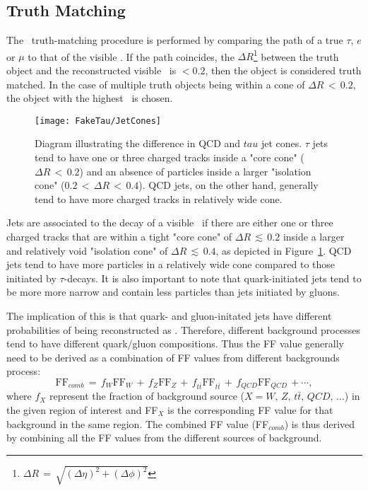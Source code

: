 	\subsection*{Truth Matching}
	The \htau\ truth-matching procedure is performed by comparing the path of a true $\tau$, $e$ or $\mu$ to that of the visible \htau. If the path coincides, \ie the $\Delta R$\footnote{$\Delta R\,=\,\sqrt{(\Delta\eta)^2+(\Delta\phi)^2}$} between the truth object and the reconstructed visible \htau\ is $<0.2$, then the object is considered truth matched. In the case of multiple truth objects being within a cone of $\Delta R\,<\, 0.2$, the object with the highest \pt\ is chosen.
	 
	\begin{figure}[!hbt]
	\centering
	\texttt{[image: FakeTau/JetCones]}
	\caption{Diagram illustrating the difference in QCD and $tau$ jet cones. $\tau$ jets tend to have one or three charged tracks inside a "core cone" ($\Delta R\,<\,0.2$) and an absence of particles inside a larger "isolation cone"  ($0.2\,<\,\Delta R\,<\,0.4$). QCD jets, on the other hand, generally tend to have more charged tracks in  relatively wide cone.}
	\label{fig:jet_cones}
	\end{figure}		
	Jets are associated to the decay of a visible \htau\ if there are either one or three charged tracks that are within a tight "core cone" of $\Delta R \,\lesssim\,0.2$ inside a larger and relatively void "isolation cone" of $\Delta R \,\lesssim\,0.4$, as depicted in Figure~\ref{fig:jet_cones}. 
	QCD jets tend to have more particles in a relatively wide cone compared to those initiated by $\tau$-decays. It is also important to note that quark-initiated jets tend to be more more narrow and contain less particles than jets initiated by gluons.
	
	The implication of this is that quark- and gluon-initated jets have different probabilities of being reconstructed as \htau. 
	Therefore, different background processes tend to have different quark/gluon compositions. Thus the \ac{FF} value generally need to be derived as a combination of \ac{FF} values from different backgrounds process:
	\begin{equation}
	\textrm{FF}_{comb}\,=\,f_W\textrm{FF}_W\,+\,f_Z\textrm{FF}_Z\,+\,f_{t\bar{t}}\textrm{FF}_{t\bar{t}}\,+\,f_{QCD}\textrm{FF}_{QCD}\,+\cdots,
	\label{eq:ff_comb}
	\end{equation}
	where $f_X$ represent the fraction of background source ($X=W,\,Z,\,t\bar{t},\,QCD,\,\ldots$) in the given region of interest and FF$_X$ is the corresponding FF value for that background in the same region. The combined FF value (FF$_{comb}$) is thus derived by combining all the FF values from the different sources of background. 
